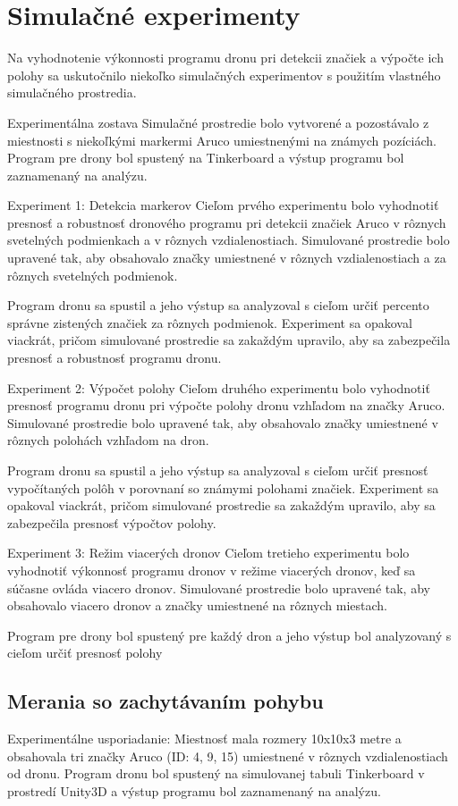\section{Simulačné experimenty}
Na vyhodnotenie výkonnosti programu dronu pri detekcii značiek a výpočte ich polohy sa uskutočnilo niekoľko simulačných experimentov s použitím vlastného simulačného prostredia.

Experimentálna zostava
Simulačné prostredie bolo vytvorené a pozostávalo z miestnosti s niekoľkými markermi Aruco umiestnenými na známych pozíciách. Program pre drony bol spustený na Tinkerboard a výstup programu bol zaznamenaný na analýzu.

Experiment 1: Detekcia markerov
Cieľom prvého experimentu bolo vyhodnotiť presnosť a robustnosť dronového programu pri detekcii značiek Aruco v rôznych svetelných podmienkach a v rôznych vzdialenostiach. Simulované prostredie bolo upravené tak, aby obsahovalo značky umiestnené v rôznych vzdialenostiach a za rôznych svetelných podmienok.

Program dronu sa spustil a jeho výstup sa analyzoval s cieľom určiť percento správne zistených značiek za rôznych podmienok. Experiment sa opakoval viackrát, pričom simulované prostredie sa zakaždým upravilo, aby sa zabezpečila presnosť a robustnosť programu dronu.

Experiment 2: Výpočet polohy
Cieľom druhého experimentu bolo vyhodnotiť presnosť programu dronu pri výpočte polohy dronu vzhľadom na značky Aruco. Simulované prostredie bolo upravené tak, aby obsahovalo značky umiestnené v rôznych polohách vzhľadom na dron.

Program dronu sa spustil a jeho výstup sa analyzoval s cieľom určiť presnosť vypočítaných polôh v porovnaní so známymi polohami značiek. Experiment sa opakoval viackrát, pričom simulované prostredie sa zakaždým upravilo, aby sa zabezpečila presnosť výpočtov polohy.

Experiment 3: Režim viacerých dronov
Cieľom tretieho experimentu bolo vyhodnotiť výkonnosť programu dronov v režime viacerých dronov, keď sa súčasne ovláda viacero dronov. Simulované prostredie bolo upravené tak, aby obsahovalo viacero dronov a značky umiestnené na rôznych miestach.

Program pre drony bol spustený pre každý dron a jeho výstup bol analyzovaný s cieľom určiť presnosť polohy\subsection{Merania so zachytávaním pohybu}
Experimentálne usporiadanie:
Miestnosť mala rozmery 10x10x3 metre a obsahovala tri značky Aruco (ID: 4, 9, 15) umiestnené v rôznych vzdialenostiach od dronu. Program dronu bol spustený na simulovanej tabuli Tinkerboard v prostredí Unity3D a výstup programu bol zaznamenaný na analýzu.


